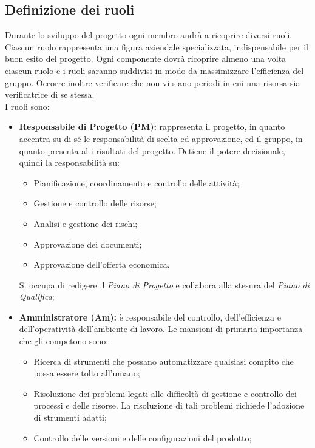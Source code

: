 	\subsection{Definizione dei ruoli}
		Durante lo sviluppo del progetto ogni membro andrà a ricoprire diversi ruoli. Ciascun ruolo rappresenta una figura aziendale specializzata, indispensabile per il buon esito del progetto. Ogni componente dovrà ricoprire almeno una volta ciascun ruolo e i ruoli saranno suddivisi in modo da massimizzare l'efficienza del gruppo. Occorre inoltre verificare che non vi siano periodi in cui una risorsa sia verificatrice di se stessa. \\
		I ruoli sono:
		\begin{itemize}
			\item \textbf{Responsabile di Progetto (PM):} rappresenta il progetto, in quanto accentra su di sé le responsabilità di scelta ed approvazione, ed il gruppo, in quanto presenta al  i risultati del progetto. Detiene il potere decisionale, quindi la responsabilità su: \\
			\begin{itemize}
				\item Pianificazione, coordinamento e controllo delle attività;
				\item Gestione e controllo delle risorse;
				\item Analisi e gestione dei rischi;
				\item Approvazione dei documenti;
				\item Approvazione dell'offerta economica. \\
			\end{itemize}
			Si occupa di redigere il \textit{Piano di Progetto} e collabora alla stesura del \textit{Piano di Qualifica};
			\item \textbf{Amministratore (Am):} è responsabile del controllo, dell'efficienza e dell'operatività dell'ambiente di lavoro. Le mansioni di primaria importanza che gli competono sono: \\
			\begin{itemize}
				\item Ricerca di strumenti che possano automatizzare qualsiasi compito che possa
essere tolto all'umano; \\
				\item Risoluzione dei problemi legati alle difficoltà di gestione e controllo dei processi
e delle risorse. La risoluzione di tali problemi richiede l'adozione di strumenti adatti;
				\item Controllo delle versioni e delle configurazioni del prodotto;

\end{itemize}
\end{itemize}
